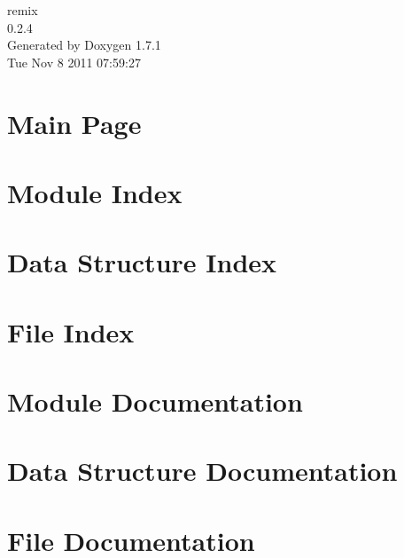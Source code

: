 \documentclass[a4paper]{book}
\begin{document}
\begin{titlepage}
\vspace*{7cm}
\begin{center}
{\Large remix \\[1ex]\large 0.2.4 }\\
\vspace*{1cm}
{\large Generated by Doxygen 1.7.1}\\
\vspace*{0.5cm}
{\small Tue Nov 8 2011 07:59:27}\\
\end{center}
\end{titlepage}
\clearemptydoublepage
{}
\tableofcontents
\clearemptydoublepage
{}
\chapter{Main Page}
\label{index}
\chapter{Module Index}

\chapter{Data Structure Index}

\chapter{File Index}

\chapter{Module Documentation}








\chapter{Data Structure Documentation}

\chapter{File Documentation}








\printindex
\end{document}
